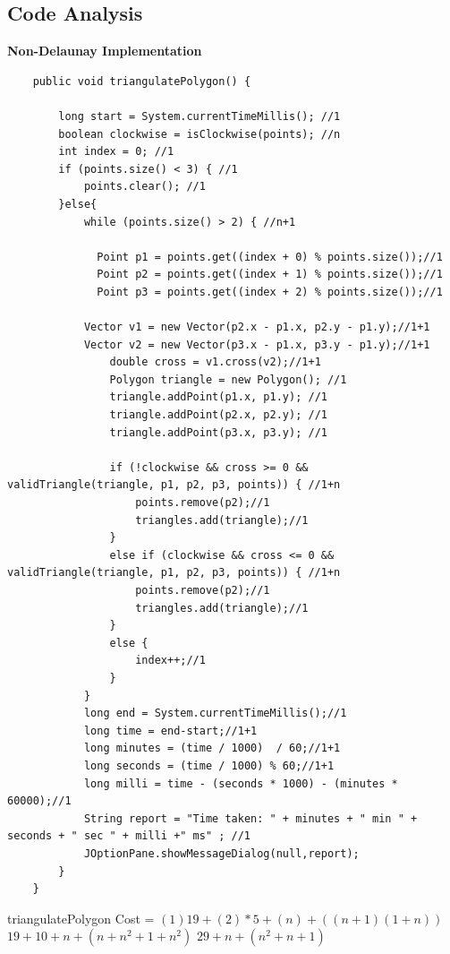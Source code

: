 \documentclass[conference]{IEEEtran}
\begin{document}
\subsection{Code Analysis}
\textbf{Non-Delaunay Implementation}
\begin{lstlisting}
    public void triangulatePolygon() {
      
        long start = System.currentTimeMillis(); //1
        boolean clockwise = isClockwise(points); //n
        int index = 0; //1
        if (points.size() < 3) { //1
            points.clear(); //1
        }else{
            while (points.size() > 2) { //n+1

              Point p1 = points.get((index + 0) % points.size());//1
              Point p2 = points.get((index + 1) % points.size());//1
              Point p3 = points.get((index + 2) % points.size());//1

            Vector v1 = new Vector(p2.x - p1.x, p2.y - p1.y);//1+1
            Vector v2 = new Vector(p3.x - p1.x, p3.y - p1.y);//1+1
                double cross = v1.cross(v2);//1+1
                Polygon triangle = new Polygon(); //1
                triangle.addPoint(p1.x, p1.y); //1
                triangle.addPoint(p2.x, p2.y); //1
                triangle.addPoint(p3.x, p3.y); //1

                if (!clockwise && cross >= 0 && validTriangle(triangle, p1, p2, p3, points)) { //1+n
                    points.remove(p2);//1
                    triangles.add(triangle);//1
                }
                else if (clockwise && cross <= 0 && validTriangle(triangle, p1, p2, p3, points)) { //1+n
                    points.remove(p2);//1
                    triangles.add(triangle);//1
                }
                else {
                    index++;//1
                }
            }
            long end = System.currentTimeMillis();//1
            long time = end-start;//1+1
            long minutes = (time / 1000)  / 60;//1+1
            long seconds = (time / 1000) % 60;//1+1
            long milli = time - (seconds * 1000) - (minutes * 60000);//1
            String report = "Time taken: " + minutes + " min " + seconds + " sec " + milli +" ms" ; //1
            JOptionPane.showMessageDialog(null,report);
        }
    }
\end{lstlisting}
triangulatePolygon Cost =
\newline
$(1)19 +(2)*5+(n)+((n+1)(1+n))$
\newline
$19+10+n+(n+n^2+1+n^2)$
\newline
$29+n+(n^2+n+1)$
\end{document}
